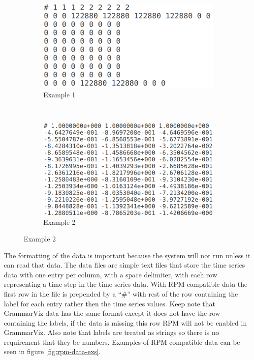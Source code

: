 \documentclass[letterpaper, 12pt]{article}
\begin{document}
\begin{figure}[h]
  \caption{Examples of RPM Data}
  \label{fig:rpm-data-exs}
  \begin{subfigure}[b]{0.5\textwidth}
    \includegraphics[width=\textwidth]{rpm_data_example_1}
    \caption{Example 1}
    \label{fig:rpm-data-ex-1}
  \end{subfigure}
  ~
  \begin{subfigure}[b]{0.5\textwidth}
    \includegraphics[width=\textwidth]{rpm_data_example_2}
    \caption{Example 2}
    \label{fig:rpm-data-ex-2}
  \end{subfigure}
\end{figure}

The formatting of the data is important because the system will not run unless it can read that data. The data files are simple text files that store the time series data with one entry per column, with a space delimiter, with each row representing a time step in the time series data. With RPM compatible data the first row in the file is prepended by a ``\#'' with rest of the row containing the label for each entry rather then the time series values. Keep note that GrammarViz data has the same format except it does not have the row containing the labels, if the data is missing this row RPM will not be enabled in GrammarViz. Also note that labels are treated as strings so there is no requirement that they be numbers. Examples of RPM compatible data can be seen in figure \ref{fig:rpm-data-exs}.
\end{document}
